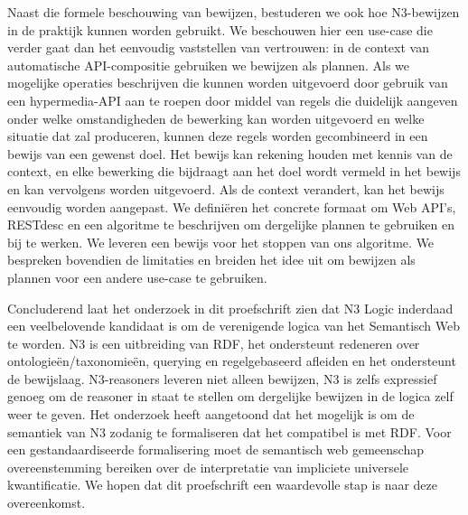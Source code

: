 Naast die formele beschouwing van bewijzen, bestuderen we ook hoe N3-bewijzen in de praktijk
kunnen worden gebruikt. We beschouwen hier een use-case die verder gaat dan het eenvoudig
vaststellen van vertrouwen: in de context van automatische API-compositie gebruiken we bewijzen
als plannen. Als we mogelijke operaties beschrijven die kunnen worden uitgevoerd door gebruik van
een hypermedia-API aan te roepen door middel van regels die duidelijk aangeven onder welke
omstandigheden de bewerking kan worden uitgevoerd en welke situatie dat zal produceren, kunnen
deze regels worden gecombineerd in een bewijs van een gewenst doel. Het bewijs kan rekening
houden met kennis van de context, en elke bewerking die bijdraagt aan het doel wordt vermeld in
het bewijs en kan vervolgens worden uitgevoerd. Als de context verandert, kan het bewijs eenvoudig
worden aangepast. We definiëren het concrete formaat om Web API's, RESTdesc en een algoritme te
beschrijven om dergelijke plannen te gebruiken en bij te werken. We leveren een bewijs voor 
het stoppen van ons algoritme. We bespreken bovendien de limitaties en breiden het idee uit om
bewijzen als plannen voor een andere use-case te gebruiken.

Concluderend laat het onderzoek in dit proefschrift zien dat N3 Logic inderdaad een
veelbelovende kandidaat is om de verenigende logica van het Semantisch Web te worden. N3 is een
uitbreiding van RDF, het ondersteunt redeneren over ontologieën/taxonomieën, querying en
regelgebaseerd afleiden en het ondersteunt de bewijslaag. N3-reasoners leveren niet alleen
bewijzen, N3 is zelfs expressief genoeg om de reasoner in staat te stellen om dergelijke bewijzen in
de logica zelf weer te geven. Het onderzoek heeft aangetoond dat het mogelijk is om de semantiek
van N3 zodanig te formaliseren dat het compatibel is met RDF. Voor een gestandaardiseerde
formalisering moet de semantisch web gemeenschap overeenstemming bereiken over de interpretatie
van impliciete universele kwantificatie. We hopen dat dit proefschrift een waardevolle stap is naar
deze overeenkomst.




